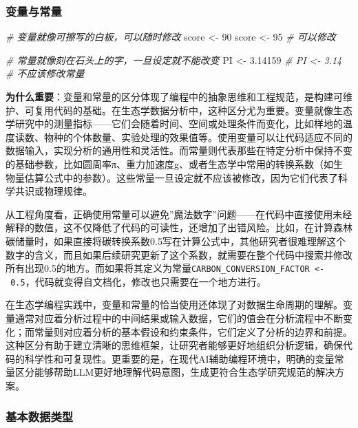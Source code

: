\documentclass[
]{book}
\newenvironment{Shaded}{\begin{snugshade}}{\end{snugshade}}
\newcommand{\CommentTok}[1]{\textcolor[rgb]{0.56,0.35,0.01}{\textit{#1}}}
\newcommand{\DecValTok}[1]{\textcolor[rgb]{0.00,0.00,0.81}{#1}}
\newcommand{\FloatTok}[1]{\textcolor[rgb]{0.00,0.00,0.81}{#1}}
\newcommand{\NormalTok}[1]{#1}
\newcommand{\OtherTok}[1]{\textcolor[rgb]{0.56,0.35,0.01}{#1}}
\begin{document}
\hypertarget{ux53d8ux91cfux4e0eux5e38ux91cf}{%
\subsubsection{变量与常量}\label{ux53d8ux91cfux4e0eux5e38ux91cf}}

\begin{Shaded}
\begin{Highlighting}[]
\CommentTok{\# 变量就像可擦写的白板，可以随时修改}
\NormalTok{score }\OtherTok{\textless{}{-}} \DecValTok{90}
\NormalTok{score }\OtherTok{\textless{}{-}} \DecValTok{95}  \CommentTok{\# 可以修改}

\CommentTok{\# 常量就像刻在石头上的字，一旦设定就不能改变}
\NormalTok{PI }\OtherTok{\textless{}{-}} \FloatTok{3.14159}
\CommentTok{\# PI \textless{}{-} 3.14  \# 不应该修改常量}
\end{Highlighting}
\end{Shaded}

\textbf{为什么重要}：变量和常量的区分体现了编程中的抽象思维和工程规范，是构建可维护、可复用代码的基础。在生态学数据分析中，这种区分尤为重要。变量就像生态学研究中的测量指标------它们会随着时间、空间或处理条件而变化，比如样地的温度读数、物种的个体数量、实验处理的效果值等。使用变量可以让代码适应不同的数据输入，实现分析的通用性和灵活性。而常量则代表那些在特定分析中保持不变的基础参数，比如圆周率π、重力加速度g、或者生态学中常用的转换系数（如生物量估算公式中的参数）。这些常量一旦设定就不应该被修改，因为它们代表了科学共识或物理规律。

从工程角度看，正确使用常量可以避免''魔法数字''问题------在代码中直接使用未经解释的数值，这不仅降低了代码的可读性，还增加了出错风险。比如，在计算森林碳储量时，如果直接将碳转换系数0.5写在计算公式中，其他研究者很难理解这个数字的含义，而且如果后续研究更新了这个系数，就需要在整个代码中搜索并修改所有出现0.5的地方。而如果将其定义为常量\texttt{CARBON\_CONVERSION\_FACTOR\ \textless{}-\ 0.5}，代码就变得自文档化，修改也只需要在一个地方进行。

在生态学编程实践中，变量和常量的恰当使用还体现了对数据生命周期的理解。变量通常对应着分析过程中的中间结果或输入数据，它们的值会在分析流程中不断变化；而常量则对应着分析的基本假设和约束条件，它们定义了分析的边界和前提。这种区分有助于建立清晰的思维框架，让研究者能够更好地组织分析逻辑，确保代码的科学性和可复现性。更重要的是，在现代AI辅助编程环境中，明确的变量常量区分能够帮助LLM更好地理解代码意图，生成更符合生态学研究规范的解决方案。

\hypertarget{ux57faux672cux6570ux636eux7c7bux578b}{%
\subsubsection{基本数据类型}\label{ux57faux672cux6570ux636eux7c7bux578b}}
\end{document}

